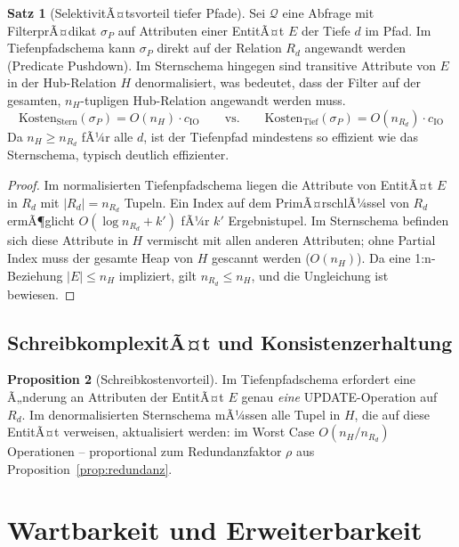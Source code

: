 ﻿\documentclass[12pt,a4paper]{article}
\theoremstyle{definition}
\newtheorem{theorem}{Satz}[section]
\newtheorem{proposition}[theorem]{Proposition}
\theoremstyle{remark}
\begin{document}
\begin{theorem}[SelektivitÃ¤tsvorteil tiefer Pfade]
\label{thm:selektivitaet}
Sei $\mathcal{Q}$ eine Abfrage mit FilterprÃ¤dikat $\sigma_P$ auf Attributen
einer EntitÃ¤t $E$ der Tiefe $d$ im Pfad. Im Tiefenpfadschema kann $\sigma_P$
direkt auf der Relation $R_d$ angewandt werden (Predicate Pushdown).
Im Sternschema hingegen sind transitive Attribute von $E$ in der Hub-Relation
$H$ de\-normalisiert, was bedeutet, dass der Filter auf der gesamten,
$n_H$-tupligen Hub-Relation angewandt werden muss.
\[
  \text{Kosten}_{\text{Stern}}(\sigma_P) = O(n_H) \cdot c_{\text{IO}}
  \qquad\text{vs.}\qquad
  \text{Kosten}_{\text{Tief}}(\sigma_P) = O(n_{R_d}) \cdot c_{\text{IO}}
\]
Da $n_H \geq n_{R_d}$ fÃ¼r alle $d$, ist der Tiefenpfad mindestens so
effizient wie das Sternschema, typisch deutlich effizienter.
\end{theorem}

\begin{proof}
Im normalisierten Tiefenpfadschema liegen die Attribute von EntitÃ¤t $E$ in
$R_d$ mit $|R_d| = n_{R_d}$ Tupeln. Ein Index auf dem PrimÃ¤rschlÃ¼ssel von
$R_d$ ermÃ¶glicht $O(\log n_{R_d} + k')$ fÃ¼r $k'$ Ergebnistupel.
Im Sternschema befinden sich diese Attribute in $H$ vermischt mit allen anderen
Attributen; ohne Partial Index muss der gesamte Heap von $H$ gescannt werden
($O(n_H)$). Da eine 1:n-Beziehung $|E| \leq n_H$ impliziert, gilt
$n_{R_d} \leq n_H$, und die Ungleichung ist bewiesen.
\end{proof}

\subsection{SchreibkomplexitÃ¤t und Konsistenzerhaltung}

\begin{proposition}[Schreibkostenvorteil]
Im Tiefenpfadschema erfordert eine Ã„nderung an Attributen der EntitÃ¤t $E$
genau \emph{eine} UPDATE-Operation auf $R_d$. Im denormalisierten
Sternschema mÃ¼ssen alle Tupel in $H$, die auf diese EntitÃ¤t verweisen,
aktualisiert werden: im Worst Case $O(n_H / n_{R_d})$ Operationen --
proportional zum Redundanzfaktor $\rho$ aus Proposition~\ref{prop:redundanz}.
\end{proposition}

\section{Wartbarkeit und Erweiterbarkeit}
\label{sec:wartbarkeit}
\end{document}
